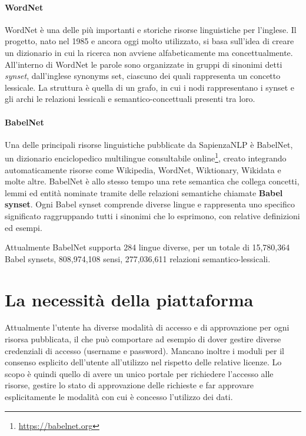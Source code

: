 \paragraph{WordNet \cite{Miller1990}}
WordNet è una delle più importanti e storiche risorse linguistiche per l'inglese.
Il progetto, nato nel 1985 e ancora oggi molto utilizzato, si basa sull'idea
di creare un dizionario in cui la ricerca non avviene alfabeticamente ma concettualmente.
All'interno di WordNet le parole sono organizzate in gruppi di sinonimi detti
\textit{synset}, dall'inglese synonyms set, ciascuno dei quali rappresenta un
concetto lessicale.
La struttura è quella di un grafo, in cui i nodi rappresentano i synset e gli archi
le relazioni lessicali e semantico-concettuali presenti tra loro.

\paragraph{BabelNet \cite{NavigliPonzetto:12aij}}
Una delle principali risorse linguistiche pubblicate da SapienzaNLP è BabelNet,
un dizionario enciclopedico multilingue consultabile online\footnote{\url{https://babelnet.org}},
creato integrando automaticamente risorse come Wikipedia, WordNet, Wiktionary,
Wikidata e molte altre.
BabelNet è allo stesso tempo una rete semantica che collega concetti, lemmi
ed entità nominate tramite delle relazioni semantiche chiamate \textbf{Babel synset}.
Ogni Babel synset comprende diverse lingue e rappresenta uno specifico significato
raggruppando tutti i sinonimi che lo esprimono, con relative definizioni ed esempi.

Attualmente BabelNet supporta 284 lingue diverse, per un totale di 15,780,364
Babel synsets, 808,974,108 sensi, 277,036,611 relazioni semantico-lessicali.



\section{La necessità della piattaforma}
Attualmente l'utente ha diverse modalità di accesso e di approvazione per ogni
risorsa pubblicata, il che può comportare ad esempio di dover gestire diverse
credenziali di accesso (username e password). Mancano inoltre i moduli per il
consenso esplicito dell'utente all'utilizzo nel rispetto delle relative licenze.
Lo scopo è quindi quello di avere un unico portale per richiedere l'accesso alle
risorse, gestire lo stato di approvazione delle richieste e far approvare
esplicitamente le modalità con cui è concesso l'utilizzo dei dati.

